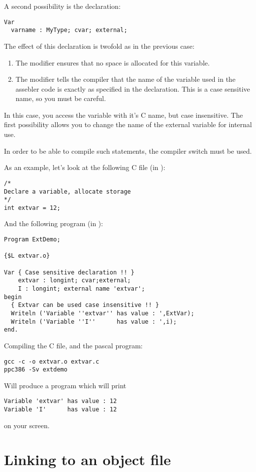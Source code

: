 \documentclass{report}
\begin{document}
A second possibility is the declaration:
\begin{verbatim}
Var
  varname : MyType; cvar; external;
\end{verbatim}
The effect of this declaration is twofold as in the previous case:
\begin{enumerate}
\item The  modifier ensures that no space is allocated for 
this variable.
\item The  modifier tells the compiler that the name of the 
variable used in the assebler code is exactly as specified in the
declaration. This is a case sensitive name, so you must be careful. 
\end{enumerate}
In this case, you access the variable with it's C name, but case
insensitive. The first possibility allows you to change the name of the 
external variable for  internal use.

In order to be able to compile such statements, the compiler switch 
must be used.

As an example, let's look at the following C file (in ):
\begin{verbatim}
/* 
Declare a variable, allocate storage 
*/
int extvar = 12;
\end{verbatim}
And the following program (in ):
\begin{verbatim}
Program ExtDemo;

{$L extvar.o}

Var { Case sensitive declaration !! }
    extvar : longint; cvar;external;
    I : longint; external name 'extvar';
begin
  { Extvar can be used case insensitive !! }
  Writeln ('Variable ''extvar'' has value : ',ExtVar);
  Writeln ('Variable ''I''      has value : ',i);
end.
\end{verbatim}
Compiling the C file, and the pascal program:
\begin{verbatim}
gcc -c -o extvar.o extvar.c
ppc386 -Sv extdemo
\end{verbatim}
Will produce a program  which will print 
\begin{verbatim}
Variable 'extvar' has value : 12
Variable 'I'      has value : 12
\end{verbatim}
on your screen.

\section{Linking to an object file}
\label{se:LinkIn}
\end{document}

